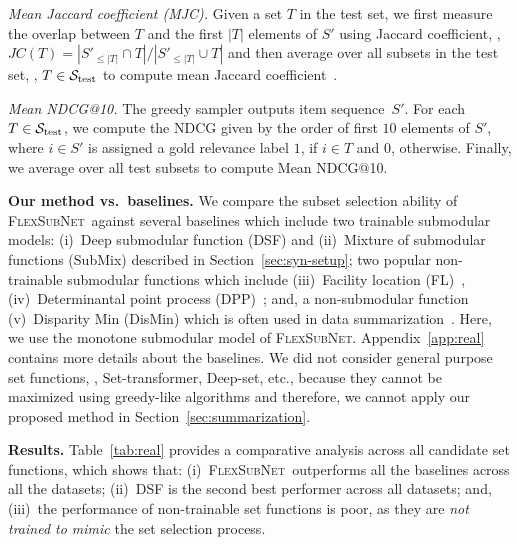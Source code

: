 \documentclass{article}
\newcommand{\ehdr}[1]{\noindent\emph{#1.}}
\newcommand{\our}{\textsc{Flex\-Sub\-Net}}
\newcommand{\xhdr}[1]{\noindent\textbf{#1.}}
\renewcommand{\cite}{\citep}
\newcommand{\deepset}{Deep-set}
\newcommand{\settx}{Set-transformer}
\begin{document}
\ehdr{Mean Jaccard coefficient (MJC)} Given a set $T$ in the test set, we first measure the overlap between $T$ and the first $|T|$ elements of $S'$  
using Jaccard coefficient, \ie, $JC(T) = |S'_{\le|T|}\cap T|/|S'_{\le|T|}\cup T|$ and then average over all subsets in the test set, \ie, $T\in {\mathcal{S}}_{\text{test}}$ to compute mean Jaccard coefficient~\cite{jaccard}. 

\ehdr{Mean NDCG@10} The greedy sampler outputs item sequence~$S'$. For each $T\in {\mathcal{S}}_{\text{test}}$, 
we compute the NDCG given by the order of first $10$ elements of $S'$, where $i\in S'$ is assigned a gold relevance label $1$, if
$i\in T$ and $0$, otherwise.
Finally, we average over all test subsets 
to compute Mean NDCG@10.


\xhdr{Our method vs.\ baselines} We compare the subset selection ability of \our\ against several baselines which include two trainable submodular models: (i)~Deep submodular function (DSF) and
  (ii)~Mixture of submodular functions (SubMix) described in Section~\ref{sec:syn-setup};
two popular non-trainable submodular functions which include (iii)~Facility location (FL)~\cite{mirchandani1990discrete,frieze1974cost}, (iv)~Determinantal point process (DPP)~\cite{borodin2009determinantal}; and, a non-submodular function (v)~Disparity Min (DisMin) which is often used in data summarization~\cite{dasgupta2013summarization}. Here, we use the monotone submodular model of \our.  Appendix~\ref{app:real} contains more details about the baselines. We did not consider general purpose set functions, \eg, \settx, \deepset, etc., because they cannot be maximized using greedy-like algorithms and therefore, we cannot apply our proposed method in Section~\ref{sec:summarization}.  
 
\xhdr{Results}
\label{sec:results}
Table~\ref{tab:real} provides a comparative analysis across all candidate set functions, which shows that: 
%
%
%
%
(i)~\our\ outperforms all the baselines across all the datasets; (ii)~DSF is the second best performer across all datasets;
and, (iii)~the performance of non-trainable set functions is poor,
as they are \emph{not trained to mimic} the set selection process.
\end{document}
